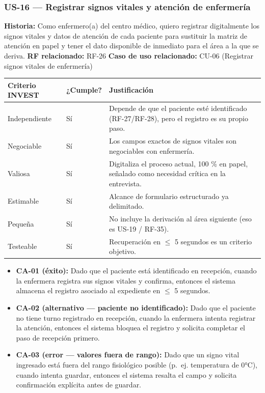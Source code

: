 \documentclass[11pt,a4paper]{article}
\providecommand{\tightlist}{%
	\setlength{\itemsep}{0pt}\setlength{\parskip}{0pt}}
\begin{document}
	\subsubsection{US-16 --- Registrar signos vitales y atención de enfermería}
	
	\textbf{Historia:} Como enfermero(a) del centro médico, quiero registrar digitalmente los signos vitales y datos de atención de cada paciente para sustituir la matriz de atención en papel y tener el dato disponible de inmediato para el área a la que se deriva.
	\textbf{RF relacionado:} RF-26
	\textbf{Caso de uso relacionado:} CU-06 (Registrar signos vitales de enfermería)
	
	\begin{longtable}{p{} p{} p{}}
		
		
		\toprule
		\textbf{Criterio INVEST} &
		\textbf{¿Cumple?} &
		\textbf{Justificación} \\
		\midrule
		\endhead
		
		Independiente & Sí & Depende de que el paciente esté identificado (RF-27/RF-28), pero el registro es su propio paso. \\
		Negociable & Sí & Los campos exactos de signos vitales son negociables con enfermería. \\
		Valiosa & Sí & Digitaliza el proceso actual, 100 \% en papel, señalado como necesidad crítica en la entrevista. \\
		Estimable & Sí & Alcance de formulario estructurado ya delimitado. \\
		Pequeña & Sí & No incluye la derivación al área siguiente (eso es US-19 / RF-35). \\
		Testeable & Sí & Recuperación en \(\leq\) 5 segundos es un criterio objetivo. \\
		\bottomrule
	\end{longtable}
	
	\begin{itemize}
		\tightlist
		\item
		\textbf{CA-01 (éxito):} Dado que el paciente está identificado en recepción, cuando la enfermera registra sus signos vitales y confirma, entonces el sistema almacena el registro asociado al expediente en \(\leq\) 5 segundos.
		\item
		\textbf{CA-02 (alternativo --- paciente no identificado):} Dado que el paciente no tiene turno registrado en recepción, cuando la enfermera intenta registrar la atención, entonces el sistema bloquea el registro y solicita completar el paso de recepción primero.
		\item
		\textbf{CA-03 (error --- valores fuera de rango):} Dado que un signo vital ingresado está fuera del rango fisiológico posible (p.~ej. temperatura de 0°C), cuando intenta guardar, entonces el sistema resalta el campo y solicita confirmación explícita antes de guardar.
	\end{itemize}
	
\end{document}
